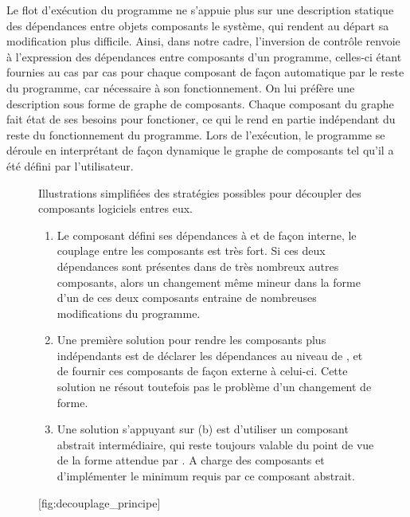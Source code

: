 Le flot d'exécution du programme ne s'appuie plus sur une description statique des dépendances entre objets composants le système, qui rendent au départ sa modification plus difficile. Ainsi, dans notre cadre, l'inversion de contrôle renvoie à l'expression des dépendances entre composants d'un programme, celles-ci étant fournies au cas par cas pour chaque composant de façon automatique par le reste du programme, car nécessaire à son fonctionnement. On lui préfère une description sous forme de graphe de composants. Chaque composant du graphe fait état de ses besoins pour fonctioner, ce qui le rend en partie indépendant du reste du fonctionnement du programme. Lors de l'exécution, le programme se déroule en interprétant de façon dynamique le graphe de composants tel qu'il a été défini par l'utilisateur. 

\begin{figure}[!htbp]
  \begin{sidecaption}[fortoc]{Illustrations simplifiées des stratégies possibles pour découpler des composants logiciels entres eux. \parbox{\marginparwidth}{
	\begin{enumerate}[label=(\alph*),labelindent=\parindent,leftmargin=*]
	        \item Le composant  défini ses dépendances à  et  de façon interne, le couplage entre les composants est très fort. Si ces deux dépendances sont présentes dans de très nombreux autres composants, alors un changement même mineur dans la forme d'un de ces deux composants entraine de nombreuses modifications du programme. 
	        \item Une première solution pour rendre les composants plus indépendants est de déclarer les dépendances au niveau de , et de fournir ces composants de façon externe à celui-ci. Cette solution ne résout toutefois pas le problème d'un changement de forme.
	        \item Une solution s'appuyant sur (b) est d'utiliser un composant abstrait intermédiaire, qui reste toujours valable du point de vue de la forme attendue par . A charge des composants  et  d'implémenter le minimum requis par ce composant abstrait.
	\end{enumerate}}}[fig:decouplage_principe]
  \centering
  \qquad
 \end{sidecaption}
\end{figure}

